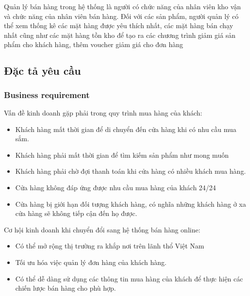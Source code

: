 \documentclass[12pt,a4paper,2sides]{report}
\begin{document}
Quản lý bán hàng trong hệ thống là người có chức năng của nhân viên kho vận và chức năng của nhân viên bán hàng. Đối với các sản phẩm, người quản lý có thể xem thống kê các mặt hàng được yêu thích nhất, các mặt hàng bán chạy nhất cũng như các mặt hàng tồn kho để tạo ra các chương trình giảm giá sản phẩm cho khách hàng, thêm voucher giảm giá cho đơn hàng

\subsection{Đặc tả yêu cầu}
\subsubsection{Business requirement}
Vấn đề kinh doanh gặp phải trong quy trình mua hàng của khách:
\begin{itemize}
    \item Khách hàng mất thời gian để di chuyển đến cửa hàng khi có nhu cầu mua sắm.
    \item Khách hàng phải mất thời gian để tìm kiếm sản phẩm như mong muốn
    \item Khách hàng phải chờ đợi thanh toán khi cửa hàng có nhiều khách mua hàng.
    \item Cửa hàng không đáp ứng được nhu cầu mua hàng của khách 24/24
    \item Cửa hàng bị giới hạn đối tượng khách hàng, có nghĩa những khách hàng ở xa cửa hàng sẽ không tiếp cận đến họ được.
\end{itemize}

Cơ hội kinh doanh khi chuyển đổi sang hệ thống bán hàng online:
\begin{itemize}
    \item Có thể mở rộng thị trường ra khắp nơi trên lãnh thổ Việt Nam
    \item Tối ưu hóa việc quản lý đơn hàng của khách hàng.
    \item Có thể dễ dàng sử dụng các thông tin mua hàng của khách để thực hiện các chiến lược bán hàng cho phù hợp.
\end{itemize}
\end{document}
